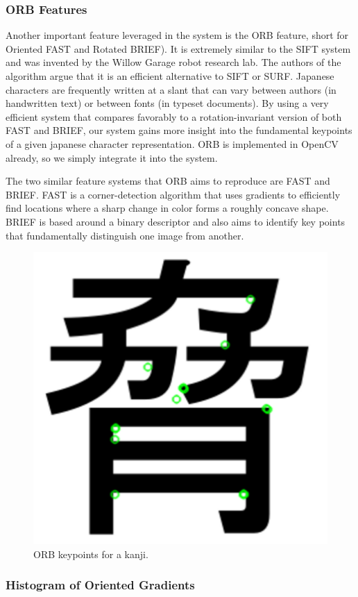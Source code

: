 \documentclass[10pt,twocolumn,letterpaper]{article}
\begin{document}
\subsubsection{ORB Features}
Another important feature leveraged in the system is the ORB feature, short for Oriented FAST and Rotated BRIEF). It is extremely similar to the SIFT system and was invented by the Willow Garage robot research lab. The authors of the algorithm argue that it is an efficient alternative to SIFT or SURF. Japanese characters are frequently written at a slant that can vary between authors (in handwritten text) or between fonts (in typeset documents). By using a very efficient system that compares favorably to a rotation-invariant version of both FAST and BRIEF, our system gains more insight into the fundamental keypoints of a given japanese character representation. ORB is implemented in OpenCV already, so we simply integrate it into the system.

The two similar feature systems that ORB aims to reproduce are FAST and BRIEF. FAST is a corner-detection algorithm that uses gradients to efficiently find locations where a sharp change in color forms a roughly concave shape. BRIEF is based around a binary descriptor and also aims to identify key points that fundamentally distinguish one image from another.

\begin{figure}[t]
    \centering
    \includegraphics[width=0.7\columnwidth]{../orb.png}
    \caption{ORB keypoints for a kanji.}
\end{figure}

\subsubsection{Histogram of Oriented Gradients}
\end{document}
